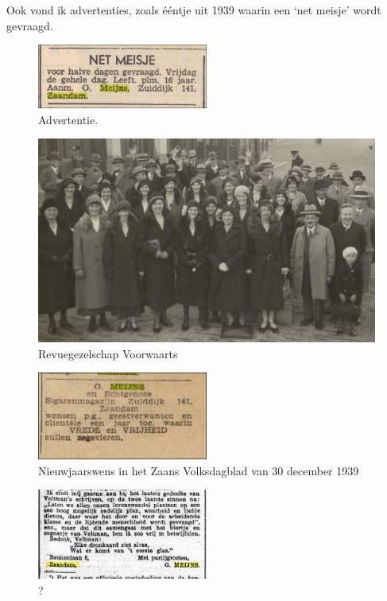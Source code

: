 \documentclass[12pt,twoside, openright]{memoir}
\begin{document}
Ook vond ik advertenties, zoals ééntje uit 1939 waarin een `net meisje' wordt gevraagd.

\begin{figure}[h!]
\includegraphics[width=0.5\textwidth]{img/ch2/ch2-afb07}
\caption*{\footnotesize Advertentie.}
\end{figure}

\begin{figure}
\includegraphics[width=\textwidth]{img/ch2/ch2-afb08}
\caption*{\footnotesize Revuegezelschap Voorwaarts}
\end{figure}


\begin{figure}
\includegraphics[width=0.5\textwidth]{img/ch2/ch2-afb09}
\caption*{\footnotesize Nieuwjaarswens in het Zaans Volksdagblad van 30 december 1939}
\end{figure}

\begin{figure}
\includegraphics[width=0.5\textwidth]{img/ch2/ch2-afb10}
\caption*{\footnotesize ?}
\end{figure}
\end{document}
